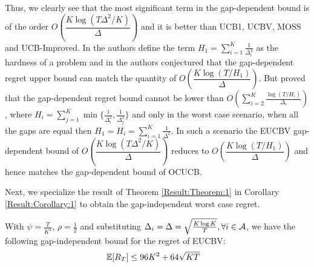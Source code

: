 Thus, we clearly see that the most significant term in the gap-dependent bound is of the order $O\left(\dfrac{K\log{(T\Delta^{2}/K)}}{\Delta}\right)$ and it is better than UCB1, UCBV, MOSS and UCB-Improved. In \citet{audibert2010best} the authors define the term $H_1=\sum_{i=1}^{K}\frac{1}{\Delta_i^2}$ as the hardness of a problem and in \citet{bubeck2012regret} the authors conjectured that the gap-dependent regret upper bound can match the quantity of $O\left(\dfrac{K\log{(T/H_1)}}{\Delta}\right)$. But \citet{lattimore2015optimally} proved that the gap-dependent regret bound cannot be lower than $O\left(\sum_{i=2}^{K}\frac{\log\left(T/H_i\right)}{\Delta_i}\right)$, where $H_i=\sum_{j=1}^{K}\min\lbrace \frac{1}{\Delta_i^2},\frac{1}{\Delta_j^2}\rbrace$ and only in the worst case scenario, when all the gaps are equal then $H_1=H_{i}=\sum_{i=1}^{K}\frac{1}{\Delta^2}$. In such a scenario the EUCBV gap-dependent bound of $O\left(\dfrac{K\log{(T\Delta^{2}/ K)}}{\Delta}\right)$ reduces to $O\left(\dfrac{K\log{(T/H_1)}}{\Delta}\right)$ and hence matches the gap-dependent bound of OCUCB.

Next, we specialize the result of Theorem \ref{Result:Theorem:1} in Corollary \ref{Result:Corollary:1} to  obtain the gap-independent worst case regret. %



\begin{corollary}
\label{Result:Corollary:1}
With $\psi=\frac{T}{K^2}$, $\rho=\frac{1}{2}$ and substituting $\Delta_i =\Delta = \sqrt{\frac{K\log K}{T}}, \forall i\in \mathcal{A}$, we have the following gap-independent bound for the regret of EUCBV:
\begin{align*}
\mathbb{E}[R_{T}] & \leq 96 K^2 + 64\sqrt{KT}
	\end{align*} 
\end{corollary}

